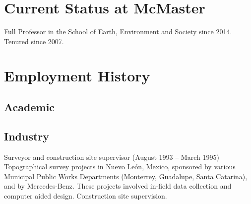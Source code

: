 \documentclass[11pt,a4paper,]{awesome-cv}
\begin{document}
\hypertarget{current-status-at-mcmaster}{%
\section{Current Status at McMaster}\label{current-status-at-mcmaster}}

Full Professor in the School of Earth, Environment and Society since
2014. Tenured since 2007.

\hypertarget{employment-history}{%
\section{Employment History}\label{employment-history}}

\hypertarget{academic}{%
\subsection{Academic}\label{academic}}

\begin{cventries}
    \vspace{-4.0mm}
    \vspace{-4.0mm}
    \vspace{-4.0mm}
    \vspace{-4.0mm}
\end{cventries}

\hypertarget{industry}{%
\subsection{Industry}\label{industry}}

Surveyor and construction site supervisor (August 1993 -- March 1995)
Topographical survey projects in Nuevo León, Mexico, sponsored by
various Municipal Public Works Departments (Monterrey, Guadalupe, Santa
Catarina), and by Mercedes-Benz. These projects involved in-field data
collection and computer aided design. Construction site supervision.

\newpage
\end{document}
